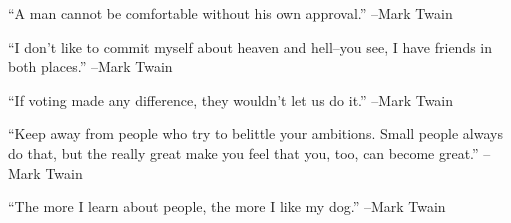 \documentclass{article}%
\begin{document}
\linebreak%
\vspace{1mm}%
\begin{minipage}{\textwidth}%
\flushleft%
“A man cannot be comfortable without his own approval.”%
\linebreak%
\vspace{1mm}%
–Mark Twain%
\linebreak%
\vspace{1mm}%
\end{minipage}%
\linebreak%
\vspace{1mm}%
\begin{minipage}{\textwidth}%
\flushleft%
“I don't like to commit myself about heaven and hell–you see, I have friends in both places.”%
\linebreak%
\vspace{1mm}%
–Mark Twain%
\linebreak%
\vspace{1mm}%
\end{minipage}%
\linebreak%
\vspace{1mm}%
\begin{minipage}{\textwidth}%
\flushleft%
“If voting made any difference, they wouldn't let us do it.”%
\linebreak%
\vspace{1mm}%
–Mark Twain%
\linebreak%
\vspace{1mm}%
\end{minipage}%
\linebreak%
\vspace{1mm}%
\begin{minipage}{\textwidth}%
\flushleft%
“Keep away from people who try to belittle your ambitions. Small people always do that, but the really great make you feel that you, too, can become great.”%
\linebreak%
\vspace{1mm}%
–Mark Twain%
\linebreak%
\vspace{1mm}%
\end{minipage}%
\linebreak%
\vspace{1mm}%
\begin{minipage}{\textwidth}%
\flushleft%
“The more I learn about people, the more I like my dog.”%
\linebreak%
\vspace{1mm}%
–Mark Twain%
\linebreak%
\vspace{1mm}%
\end{minipage}%
\end{document}
